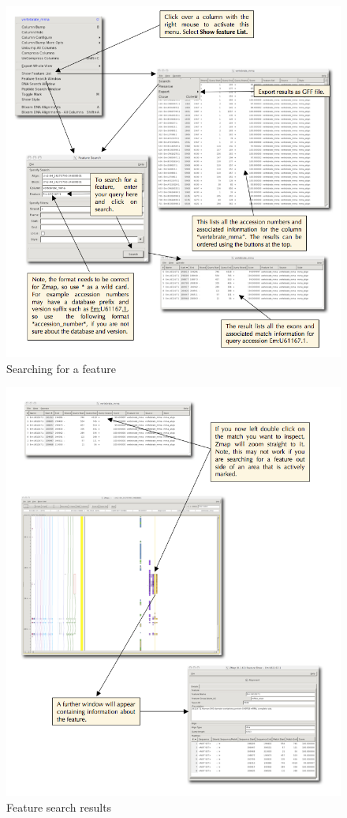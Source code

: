 \documentclass[letterpaper]{article}
\begin{document}
\begin{figure}
\centering
\color[rgb]{0.30980393,0.5058824,0.7411765}
\includegraphics[width=15.231cm]{images/feature_search.png}
\caption{Searching for a feature}
\label{img_feature_search}
\end{figure}

\begin{figure}
\centering
\color[rgb]{0.30980393,0.5058824,0.7411765}
\includegraphics[width=15.231cm]{images/feature_search_results.png}
\caption{Feature search results}
\label{img_feature_search_results}
\end{figure}
\end{document}

